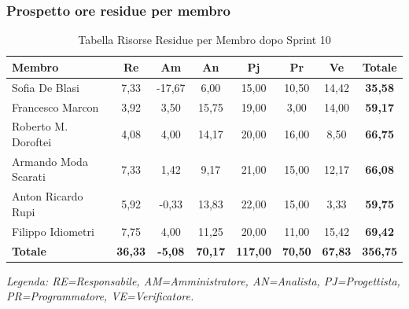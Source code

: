 \subsubsection{Prospetto ore residue per membro}
\begin{table}[H]
    \centering
    \renewcommand{\arraystretch}{1.3}
    \begin{tabularx}{\textwidth}{|X|c|c|c|c|c|c|c|}
        \hline
        \textbf{Membro} & \textbf{Re} & \textbf{Am} & \textbf{An} &
        \textbf{Pj} & \textbf{Pr} & \textbf{Ve} & \textbf{Totale} \\
        \hline
        Sofia De Blasi       &  7,33 & -17,67 &  6,00 & 15,00 & 10,50 & 14,42 & \textbf{35,58} \\
        Francesco Marcon     &  3,92 &  3,50 & 15,75 & 19,00 &  3,00 & 14,00 & \textbf{59,17} \\
        Roberto M. Doroftei  &  4,08 &  4,00 & 14,17 & 20,00 & 16,00 &  8,50 & \textbf{66,75} \\
        Armando Moda Scarati &  7,33 &  1,42 &  9,17 & 21,00 & 15,00 & 12,17 & \textbf{66,08} \\
        Anton Ricardo Rupi   &  5,92 &  -0,33 & 13,83 & 22,00 & 15,00 &  3,33 & \textbf{59,75} \\
        Filippo Idiometri    &  7,75 &  4,00 & 11,25 & 20,00 & 11,00 & 15,42 & \textbf{69,42} \\
        \hline
        \textbf{Totale} &
        \textbf{36,33} & \textbf{-5,08} & \textbf{70,17} &
        \textbf{117,00} & \textbf{70,50} & \textbf{67,83} &
        \textbf{356,75} \\
        \hline
    \end{tabularx}
    \begin{minipage}{\textwidth}
        \smallskip
        \footnotesize\textit{Legenda: RE=Responsabile, AM=Amministratore,
        AN=Analista, PJ=Progettista, PR=Programmatore, VE=Verificatore.}
    \end{minipage}
    \caption{Tabella Risorse Residue per Membro dopo Sprint 10}
\end{table}


